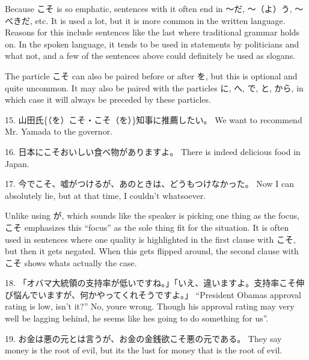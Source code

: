 \par{ Because こそ is so emphatic, sentences with it often end in ～だ, ～（よ）う, ～べきだ, etc. It is used a lot, but it is more common in the written language. Reasons for this include sentences like the last where traditional grammar holds on. In the spoken language, it tends to be used in statements by politicians and what not, and a few of the sentences above could definitely be used as slogans. }

\par{ The particle こそ can also be paired before or after を, but this is optional and quite uncommon. It may also be paired with the particles に, へ, で, と, から, in which case it will always be preceded by these particles. }

\par{15. 山田氏\{（を）こそ・こそ（を）\}知事に推薦したい。 \hfill\break
We want to recommend Mr. Yamada to the governor. }

\par{16. 日本にこそおいしい食べ物がありますよ。 \hfill\break
There is indeed delicious food in Japan. }

\par{17. 今でこそ、嘘がつけるが、あのときは、どうもつけなかった。 \hfill\break
Now I can absolutely lie, but at that time, I couldn't whatsoever. }

\par{ Unlike using が, which sounds like the speaker is picking one thing as the focus, こそ emphasizes this “focus” as the sole thing fit for the situation. It is often used in sentences where one quality is highlighted in the first clause with こそ, but then it gets negated. When this gets flipped around, the second clause with こそ shows what\textquotesingle s actually the case. }

\par{18. 「オバマ大統領の支持率が低いですね。」「いえ、違いますよ。支持率こそ伸び悩んでいますが、何かやってくれそうですよ。」 \hfill\break
“President Obama\textquotesingle s approval rating is low, isn't it?” No, you\textquotesingle re wrong. Though his approval rating may very well be lagging behind, he seems like he\textquotesingle s going to do something for us”. }

\par{19. お金は悪の元とは言うが、お金の金銭欲こそ悪の元である。 \hfill\break
They say money is the root of evil, but it\textquotesingle s the lust for money that is the root of evil. }

